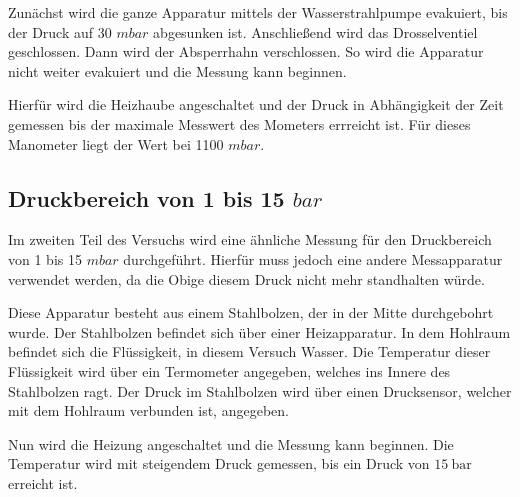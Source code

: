 Zunächst wird die ganze Apparatur mittels der Wasserstrahlpumpe evakuiert, bis der Druck auf 30 $mbar$ abgesunken ist.
Anschließend wird das Drosselventiel geschlossen.
Dann wird der Absperrhahn verschlossen.
So wird die Apparatur nicht weiter evakuiert und die Messung kann beginnen.

Hierfür wird die Heizhaube angeschaltet und der Druck in Abhängigkeit der Zeit gemessen bis der maximale Messwert des Mometers errreicht ist.
Für dieses Manometer liegt der Wert bei 1100 $mbar$.

\subsection{Druckbereich von 1 bis 15 $bar$}
Im zweiten Teil des Versuchs wird eine ähnliche Messung für den Druckbereich von 1 bis 15 $mbar$ durchgeführt.
Hierfür muss jedoch eine andere Messapparatur verwendet werden, da die Obige diesem Druck nicht mehr standhalten würde.

Diese Apparatur besteht aus einem Stahlbolzen, der in der Mitte durchgebohrt wurde.
Der Stahlbolzen befindet sich über einer Heizapparatur.
In dem Hohlraum befindet sich die Flüssigkeit, in diesem Versuch Wasser.
Die Temperatur dieser Flüssigkeit wird über ein Termometer angegeben, welches ins Innere des Stahlbolzen ragt.
Der Druck im Stahlbolzen wird über einen Drucksensor, welcher mit dem Hohlraum verbunden ist, angegeben.

Nun wird die Heizung angeschaltet und die Messung kann beginnen.
Die Temperatur wird mit steigendem Druck gemessen, bis ein Druck von $\SI{15}{\bar}$ erreicht ist.
